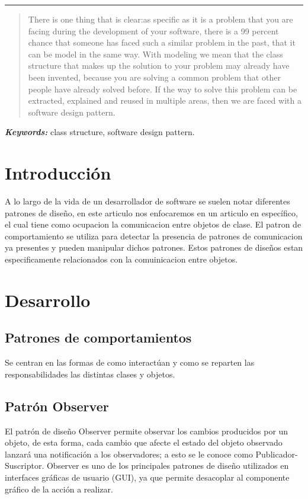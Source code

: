 \documentclass[12pt,letterpaper]{article}
\providecommand{\keywords}[1]
{
  \small	
  \textbf{\textit{Keywords: }} #1
}
\begin{document}
\begin{center}\rule{1\textwidth}{0.05mm} \end{center}

\begin{abstract}
    There is one thing that is clear:as specific as it is a problem that you are facing during the development of your software, there is a 99 percent chance that someone has faced such a similar problem in the past, that it can be model in the same way. 
    With modeling we mean that the class structure that makes up the solution to your problem may already have been invented, because you are solving a common problem that other people have already solved before. If the way to solve this problem can be extracted, explained and reused in multiple areas, then we are faced with a software design pattern. 
    
\end{abstract}
\keywords{class structure, software design pattern.}



\section{Introducción}
A lo largo de la vida de un desarrollador de software se suelen notar diferentes patrones de diseño, en este articulo nos enfocaremos en 
un articulo en específico, el cual tiene como ocupacion la comunicacion entre objetos de clase.
El patron de comportamiento se utiliza para detectar la presencia de patrones de comunicacion ya presentes y pueden manipular dichos patrones.
Estos patrones de diseños estan especificamente relacionados con la comuinicacion entre objetos.
\section{Desarrollo}
\subsection{Patrones de comportamientos}
Se centran en las formas de como interactúan y como se reparten las responsabilidades las distintas clases y objetos.

\subsection{Patrón Observer}
El patrón de diseño Observer permite observar los cambios producidos por un objeto, de esta forma, cada cambio que afecte el estado del objeto observado lanzará una notificación a los observadores; a esto se le conoce como Publicador-Suscriptor. Observer es uno de los principales patrones de diseño utilizados en interfaces gráficas de usuario (GUI), ya que permite desacoplar al componente gráfico de la acción a realizar. 
\end{document}

